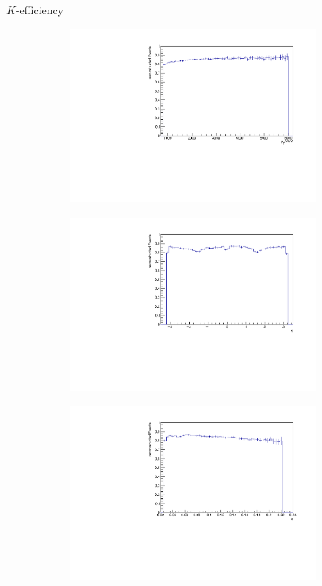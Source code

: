 \documentclass[11pt]{beamer}
\begin{document}
\begin{frame}{$K$-efficiency}
\begin{figure}
\begin{subfigure}{0.45\textwidth}
\includegraphics[width=0.9\textwidth]{up_pdf/tot/h_pt_reco_K.pdf}
\end{subfigure}
\begin{subfigure}{0.45\textwidth}
\includegraphics[width=0.9\textwidth]{up_pdf/tot/h_phi_reco_K.pdf}
\end{subfigure}
\begin{subfigure}{0.45\textwidth}
\includegraphics[width=0.9\textwidth]{up_pdf/tot/h_theta_reco_K.pdf}

\end{subfigure}
\end{figure}
\end{frame}
\end{document}
